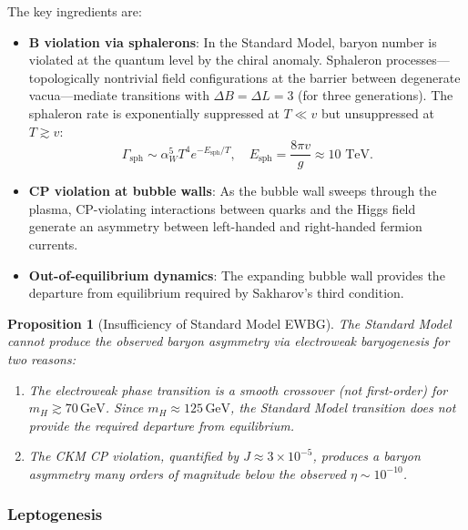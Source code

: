 \documentclass[12pt]{article}
\newtheorem{proposition}[theorem]{Proposition}
\theoremstyle{definition}
\theoremstyle{remark}
\newcommand{\GeV}{\,\text{GeV}}
\begin{document}
The key ingredients are:
\begin{itemize}
    \item \textbf{B violation via sphalerons}: In the Standard Model, baryon number
    is violated at the quantum level by the chiral anomaly. Sphaleron processes---topologically
    nontrivial field configurations at the barrier between degenerate vacua---mediate
    transitions with $\Delta B = \Delta L = 3$ (for three generations). The sphaleron
    rate is exponentially suppressed at $T \ll v$ but unsuppressed at $T \gtrsim v$:
    \begin{equation}
    \Gamma_{\text{sph}} \sim \alpha_W^5 T^4 e^{-E_{\text{sph}}/T}, \quad E_{\text{sph}} = \frac{8\pi v}{g} \approx 10\text{ TeV}.
    \end{equation}

    \item \textbf{CP violation at bubble walls}: As the bubble wall sweeps through
    the plasma, CP-violating interactions between quarks and the Higgs field generate
    an asymmetry between left-handed and right-handed fermion currents.

    \item \textbf{Out-of-equilibrium dynamics}: The expanding bubble wall provides
    the departure from equilibrium required by Sakharov's third condition.
\end{itemize}

\begin{proposition}[Insufficiency of Standard Model EWBG]
\label{prop:ewbg_failure}
The Standard Model cannot produce the observed baryon asymmetry via electroweak
baryogenesis for two reasons:
\begin{enumerate}
    \item The electroweak phase transition is a smooth crossover (not first-order)
    for $m_H \gtrsim 70\GeV$. Since $m_H \approx 125\GeV$, the Standard Model
    transition does not provide the required departure from equilibrium.
    \item The CKM CP violation, quantified by $J \approx 3 \times 10^{-5}$, produces
    a baryon asymmetry many orders of magnitude below the observed $\eta \sim 10^{-10}$.
\end{enumerate}
\end{proposition}

\subsubsection{Leptogenesis}
\end{document}
